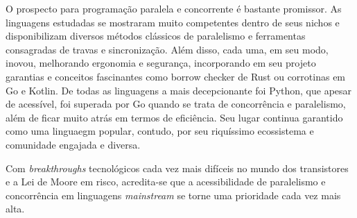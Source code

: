 \documentclass[12pt,a4paper]{article}
\begin{document}
O prospecto para programação paralela e concorrente é bastante promissor. As linguagens estudadas se mostraram muito competentes dentro de seus nichos e disponibilizam diversos métodos clássicos de paralelismo e ferramentas consagradas de travas e sincronização. Além disso, cada uma, em seu modo, inovou, melhorando ergonomia e segurança, incorporando em seu projeto garantias e conceitos fascinantes como borrow checker de Rust ou corrotinas em Go e Kotlin.
De todas as linguagens a mais decepcionante foi Python, que apesar de acessível, foi superada por Go quando se trata de concorrência e paralelismo, além de ficar muito atrás em termos de eficiência. Seu lugar continua garantido como uma linguaegm popular, contudo, por seu riquíssimo ecossistema e comunidade engajada e diversa.

Com \emph{breakthroughs} tecnológicos cada vez mais difíceis no mundo dos transistores e a Lei de Moore em risco, acredita-se que a acessibilidade de paralelismo e concorrência em linguagens \emph{mainstream} se torne uma prioridade cada vez mais alta.




\newpage
\singlespacing



\end{document}
